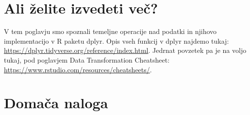 \documentclass[
]{book}
\begin{document}
\hypertarget{ali-ux17eelite-izvedeti-veux10d}{%
\section{Ali želite izvedeti več?}\label{ali-ux17eelite-izvedeti-veux10d}}

V tem poglavju smo spoznali temeljne operacije nad podatki in njihovo implementacijo v R paketu dplyr. Opis vseh funkcij v dplyr najdemo tukaj: \url{https://dplyr.tidyverse.org/reference/index.html}. Jedrnat povzetek pa je na voljo tukaj, pod poglavjem Data Transformation Cheatsheet: \url{https://www.rstudio.com/resources/cheatsheets/}.

\hypertarget{domaux10da-naloga}{%
\section{Domača naloga}\label{domaux10da-naloga}}
\end{document}
